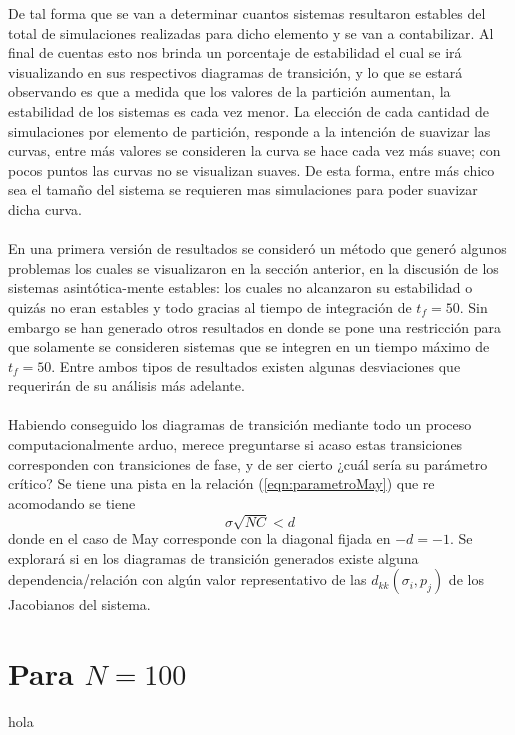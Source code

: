 De tal forma que se van a determinar cuantos sistemas resultaron estables del total de simulaciones realizadas para dicho elemento y se van a contabilizar. Al final de cuentas esto nos brinda un porcentaje de estabilidad el cual se irá visualizando en sus respectivos diagramas de transición, y lo que se estará observando es que a medida que los valores de la partición aumentan, la estabilidad de los sistemas es cada vez menor. La elección de cada cantidad de simulaciones por elemento de partición, responde a la intención de suavizar las curvas, entre más valores se consideren la curva se hace cada vez más suave; con pocos puntos las curvas no se visualizan suaves. De esta forma, entre más chico sea el tamaño del sistema se requieren mas simulaciones para poder suavizar dicha curva.\\
\\
En una primera versión de resultados se consideró un método que generó algunos problemas los cuales se visualizaron en la sección anterior, en la discusión de los sistemas asintótica-mente estables: los cuales no alcanzaron su estabilidad o quizás no eran estables y todo gracias al tiempo de integración de $t_f=50$. Sin embargo se han generado otros resultados en donde se pone una restricción para que solamente se consideren sistemas que se integren en un tiempo máximo de $t_f=50$. Entre ambos tipos de resultados existen algunas desviaciones que requerirán de su análisis más adelante.\\
\\
Habiendo conseguido los diagramas de transición mediante todo un proceso computacionalmente arduo, merece preguntarse si acaso estas transiciones corresponden con transiciones de fase, y de ser cierto ¿cuál sería su parámetro crítico? Se tiene una pista en la relación (\ref{eqn:parametroMay}) que re acomodando se tiene
\begin{equation}\label{eqn:ParametroCritico}
	\sigma\sqrt{NC}<d
\end{equation}
donde en el caso de May corresponde con la diagonal fijada en $-d=-1$. Se explorará si en los diagramas de transición generados existe alguna dependencia/relación con algún valor representativo de las $d_{kk}(\sigma_i,p_j)$ de los Jacobianos del sistema.

\section{Para $N=100$}

hola